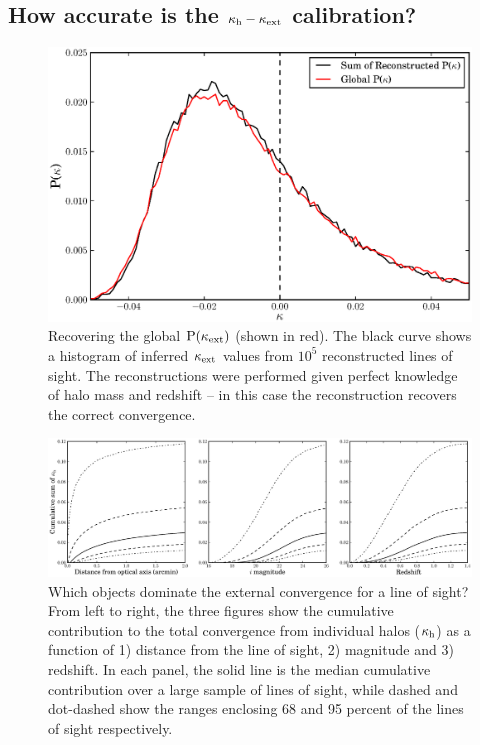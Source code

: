 \documentclass[useAMS,usenatbib,a4paper]{mn2e}
\begin{document}

\subsection{How accurate is the $\kappa_{\rm h} - \kappa_{\rm ext}$ calibration?}

\begin{figure}
\includegraphics[width=\columnwidth]{figs/globaldist.eps}
\caption[magcut]{Recovering the global ${\rm P}(\kappa_{\rm ext})$ (shown in red). The
black curve shows a histogram of  inferred  $\kappa_{\rm ext}$ values from $10^{5}$
reconstructed lines of sight.  The reconstructions were performed given
perfect knowledge of halo mass and redshift -- in this case the reconstruction
recovers the correct convergence.}
\label{fig:globaldist}
\end{figure}

\begin{figure}
\includegraphics[width=\textwidth]{figs/where_is_the_kappa.eps}
\caption[magcut]{Which objects dominate the external convergence for a line of
sight? From left to right, the three figures show the cumulative contribution
to the total convergence from individual halos ($\kappa_{\rm h}$) as a function of
1) distance from the line of sight, 2) magnitude and 3) redshift.   In each
panel, the solid line is the median cumulative contribution over a large
sample of lines of sight, while dashed and dot-dashed show the ranges enclosing 68
and 95 percent of the lines of sight respectively.}
\label{fig:where}
\end{figure}
\end{document}
